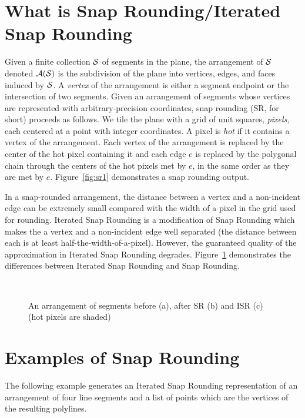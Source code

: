 \section{What is Snap Rounding/Iterated Snap Rounding}
Given a finite collection $\S$ of segments in the plane, the
arrangement of $\S$ denoted $\A(\S)$ is the subdivision of the plane
into vertices, edges, and faces induced by $\S$. %
A {\it vertex\/} of the arrangement is either a segment endpoint or
the intersection of two segments. Given an arrangement of segments
whose vertices are represented with arbitrary-precision coordinates,
snap rounding (SR, for short) proceeds as follows.  We tile the plane
with a grid of unit squares, {\it pixels}, each centered at a point
with integer coordinates. A pixel is {\it hot\/} if it contains a
vertex of the arrangement. Each vertex of the arrangement is replaced
by the center of the hot pixel containing it and each edge $e$ is
replaced by the polygonal chain through the centers of the hot pixels
met by $e$, in the same order as they are met by $e$. 
Figure~\ref{fig:sr1} demonstrates a snap rounding output. 

In a snap-rounded arrangement, the distance between a vertex and
a non-incident edge can be extremely small compared with the width of a
pixel in the grid used for rounding. Iterated Snap Rounding is a modification
of Snap Rounding which makes the a vertex and a non-incident edge well separated
(the distance between each is at least half-the-width-of-a-pixel).
However, the guaranteed quality of the approximation in Iterated Snap Rounding
degrades. Figure~\ref{fig:isr_vs_sr} demonstrates the differences between Iterated
Snap Rounding and Snap Rounding.

\begin{figure}
\begin{center}
\  \
\end{center}
\vspace{-2ex}
\caption{An arrangement of segments before (a), after SR (b)
and ISR (c) (hot pixels are shaded)}
\label{fig:isr_vs_sr}
\end{figure}

\section{Examples of Snap Rounding}

The following example generates an Iterated Snap Rounding representation
of an arrangement of four line segments
and a list of points which are the vertices of the resulting polylines.




